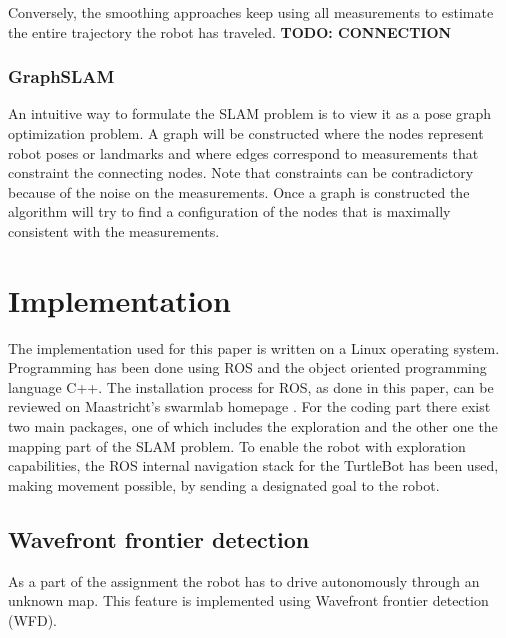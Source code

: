 \documentclass{ba-kecs}
\begin{document}
Conversely, the smoothing approaches keep using all measurements to estimate the entire trajectory the robot has traveled.
\textbf{TODO: CONNECTION}
\subsubsection{GraphSLAM}
An intuitive way to formulate the SLAM problem is to view it as a pose graph optimization problem. A graph will be constructed where the nodes represent robot poses or landmarks and where edges correspond to measurements that constraint the connecting nodes. Note that constraints can be contradictory because of the noise on the measurements. Once a graph is constructed the algorithm will try to find a configuration of the nodes that is maximally consistent with the measurements.

\section{Implementation}
\label{sec:impl}

The implementation used for this paper is written on a Linux operating system. Programming has been done using ROS and the object oriented programming language C++. The installation process for ROS, as done in this paper, can be reviewed on Maastricht's swarmlab homepage \cite{swarmlab}.
 For the coding part there exist two main packages, one of which includes the exploration and the other one the mapping part of the SLAM problem. To enable the robot with exploration capabilities, the ROS internal navigation stack for the TurtleBot has been used, making movement possible, by sending a designated goal to the robot.

\subsection{Wavefront frontier detection}

As a part of the assignment the robot has to drive autonomously through an unknown map. This feature is implemented using Wavefront frontier detection (WFD).
\end{document}
